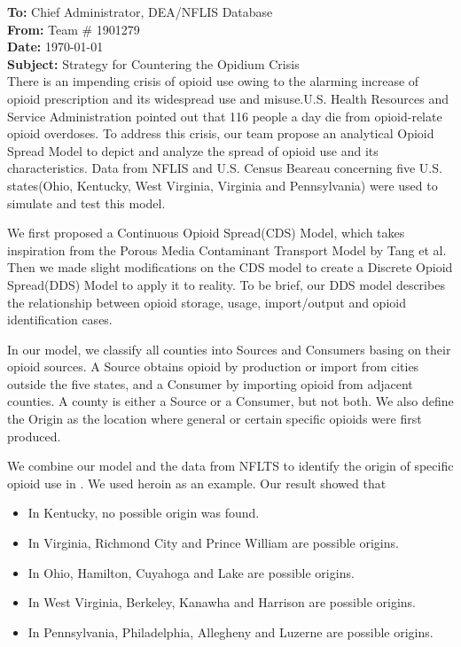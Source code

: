 \textbf{To: }Chief Administrator, DEA/NFLIS Database \\
\textbf{From: }Team \# 1901279 \\
\textbf{Date: }\today \\
\textbf{Subject: }Strategy for Countering the Opidium Crisis \\

There is an impending crisis of opioid use owing to the alarming increase of opioid prescription and its widespread use and misuse.U.S. Health Resources and Service Administration pointed out that 116 people a day die from opioid-relate opioid overdoses. To address this crisis, our team propose an analytical Opioid Spread Model to depict and analyze the spread of opioid use and its characteristics. Data from NFLIS and U.S. Census Beareau concerning five U.S. states(Ohio, Kentucky, West Virginia, Virginia and Pennsylvania) were used to simulate and test this model.

We first proposed a Continuous Opioid Spread(CDS) Model, which takes inspiration from the Porous Media Contaminant Transport Model by Tang et al. Then we made slight modifications on the CDS model to create a Discrete Opioid Spread(DDS) Model to apply it to reality. To be brief, our DDS model describes the relationship between opioid storage, usage, import/output and opioid identification cases. 

In our model, we classify all counties into Sources and Consumers basing on their opioid sources. A Source obtains opioid by production or import from cities outside the five states, and a Consumer by importing opioid from adjacent counties. A county is either a Source or a Consumer, but not both. We also define the Origin as the location where general or certain specific opioids were first produced.

We combine our model and the data from NFLTS to identify the origin of specific opioid use in . We used heroin as an example. Our result showed that 
\begin{itemize}
	\item In Kentucky, no possible origin was found.
	\item In Virginia, Richmond City and Prince William are possible origins.
	\item In Ohio, Hamilton, Cuyahoga and Lake are possible origins.
	\item In West Virginia, Berkeley, Kanawha and Harrison are possible origins.
	\item In Pennsylvania, Philadelphia, Allegheny and Luzerne are possible origins.
\end{itemize}

